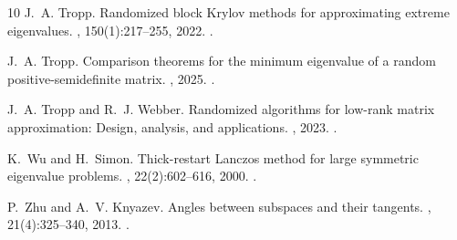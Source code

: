 \documentclass{article}
\begin{document}
\begin{thebibliography}{10}
J.~A. Tropp.
\newblock Randomized block {K}rylov methods for approximating extreme
  eigenvalues.
, 150(1):217--255, 2022.
\newblock \href {https://doi.org/10.1007/s00211-021-01250-3}
  {}.

J.~A. Tropp.
\newblock Comparison theorems for the minimum eigenvalue of a random
  positive-semidefinite matrix.
, 2025.
\newblock \href {https://doi.org/10.48550/arXiv.2501.16578}
  {}.

J.~A. Tropp and R.~J. Webber.
\newblock Randomized algorithms for low-rank matrix approximation: Design,
  analysis, and applications.
, 2023.
\newblock \href {https://doi.org/10.48550/arXiv.2306.12418}
  {}.

K.~Wu and H.~Simon.
\newblock Thick-restart {L}anczos method for large symmetric eigenvalue
  problems.
, 22(2):602--616, 2000.
\newblock \href {https://doi.org/10.1137/S0895479898334605}
  {}.

P.~Zhu and A.~V. Knyazev.
\newblock Angles between subspaces and their tangents.
, 21(4):325--340, 2013.
\newblock \href {https://doi.org/10.1515/jnum-2013-0013}
  {}.

\end{thebibliography}
\end{document}
